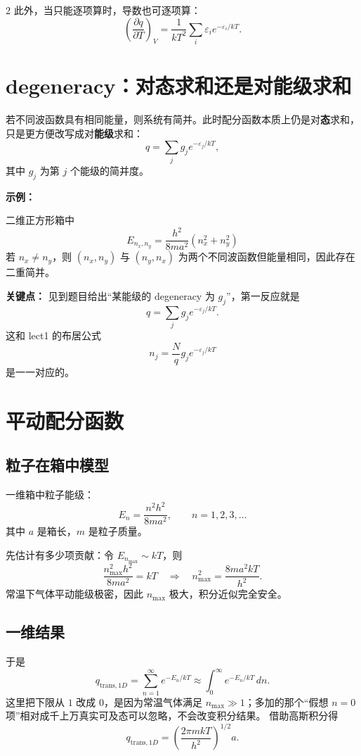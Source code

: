 \documentclass[a4paper,9pt]{article}
\newenvironment{keypoint}
{\par\vspace{0.3em}\noindent\begin{tcolorbox}[
  colback=keybg,
  colframe=keycolor,
  boxrule=0.5pt,
  arc=2pt,
  left=2pt,
  right=2pt,
  top=2pt,
  bottom=2pt,
  boxsep=0pt,
  ]
\noindent\textcolor{keycolor}{\textbf{关键点：}}}
{\end{tcolorbox}\par\vspace{0.3em}}
\newenvironment{examplebox}
{\par\vspace{0.3em}\noindent\begin{tcolorbox}[
  colback=boxbg,
  colframe=derivcolor,
  boxrule=0.5pt,
  arc=2pt,
  left=2pt,
  right=2pt,
  top=2pt,
  bottom=2pt,
  boxsep=0pt,
  ]
\scriptsize\noindent\textcolor{derivcolor}{\textbf{示例：}}\par
\setlength{\parskip}{0.1ex}\setlength{\itemsep}{0pt}\setlength{\parsep}{0pt}}
{\end{tcolorbox}\par\vspace{0.3em}}
\begin{document}
\begin{multicols}{2}
	此外，当只能逐项算时，导数也可逐项算：
	\[
		\left(\frac{\partial q}{\partial T}\right)_V
		=\frac1{kT^2}\sum_i \varepsilon_i e^{-\varepsilon_i/kT}.
	\]

	\section{degeneracy：对态求和还是对能级求和}

	若不同波函数具有相同能量，则系统有简并。此时配分函数本质上仍是对\textbf{态}求和，只是更方便改写成对\textbf{能级}求和：
	\[
		q=\sum_j g_j e^{-\varepsilon_j/kT},
	\]
	其中 $g_j$ 为第 $j$ 个能级的简并度。

	\begin{examplebox}
		二维正方形箱中
		\[
			E_{n_x,n_y}=\frac{h^2}{8ma^2}(n_x^2+n_y^2)
		\]
		若 $n_x\neq n_y$，则 $(n_x,n_y)$ 与 $(n_y,n_x)$ 为两个不同波函数但能量相同，因此存在二重简并。
	\end{examplebox}

	\begin{keypoint}
		见到题目给出“某能级的 degeneracy 为 $g_j$”，第一反应就是
		\[
			q=\sum_j g_j e^{-\varepsilon_j/kT}.
		\]
		这和 lect1 的布居公式
		\[
			n_j=\frac{N}{q}g_j e^{-\varepsilon_j/kT}
		\]
		是一一对应的。
	\end{keypoint}

	\section{平动配分函数}

	\subsection{粒子在箱中模型}
	一维箱中粒子能级：
	\[
		E_n=\frac{n^2h^2}{8ma^2},\qquad n=1,2,3,\dots
	\]
	其中 $a$ 是箱长，$m$ 是粒子质量。

	先估计有多少项贡献：令 $E_{n_{\max}}\sim kT$，则
	\[
		\frac{n_{\max}^2h^2}{8ma^2}=kT
		\quad\Rightarrow\quad
		n_{\max}^2=\frac{8ma^2kT}{h^2}.
	\]
	常温下气体平动能级极密，因此 $n_{\max}$ 极大，积分近似完全安全。

	\subsection{一维结果}
	于是
	\[
		q_{\mathrm{trans},1D}=\sum_{n=1}^{\infty} e^{-E_n/kT}
		\approx \int_0^{\infty} e^{-E_n/kT}\,dn.
	\]
	这里把下限从 $1$ 改成 $0$，是因为常温气体满足 $n_{\max}\gg 1$；多加的那个“假想 $n=0$ 项”相对成千上万真实可及态可以忽略，不会改变积分结果。
	借助高斯积分得
	\[
		q_{\mathrm{trans},1D}=\left(\frac{2\pi mkT}{h^2}\right)^{1/2}a.
	\]


\end{multicols}
\end{document}
